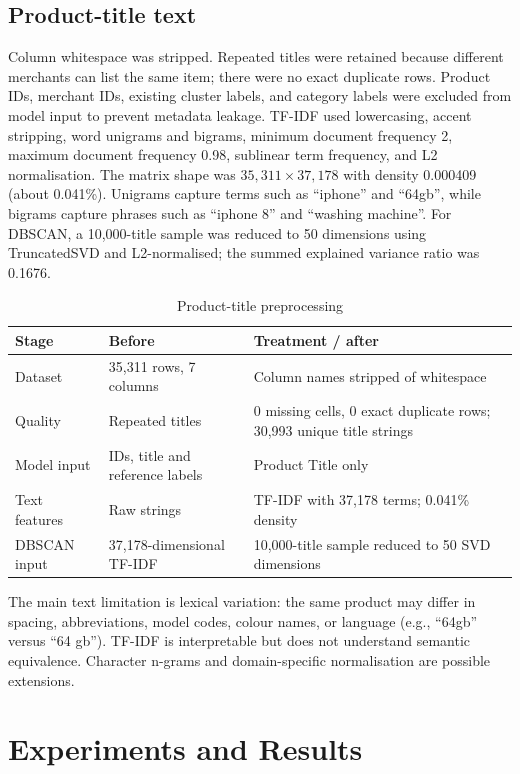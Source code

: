 \documentclass[conference]{IEEEtran}
\begin{document}
\subsection{Product-title text}
Column whitespace was stripped. Repeated titles were retained because different merchants can list the same item; there were no exact duplicate rows. Product IDs, merchant IDs, existing cluster labels, and category labels were excluded from model input to prevent metadata leakage. TF-IDF used lowercasing, accent stripping, word unigrams and bigrams, minimum document frequency 2, maximum document frequency 0.98, sublinear term frequency, and L2 normalisation. The matrix shape was $35{,}311 \times 37{,}178$ with density 0.000409 (about 0.041\%). Unigrams capture terms such as ``iphone'' and ``64gb'', while bigrams capture phrases such as ``iphone 8'' and ``washing machine''. For DBSCAN, a 10,000-title sample was reduced to 50 dimensions using TruncatedSVD and L2-normalised; the summed explained variance ratio was 0.1676.
\begin{table}[t]
\caption{Product-title preprocessing}
\centering\scriptsize
\begin{tabular}{p{}p{}p{}}
\toprule Stage & Before & Treatment / after\\\midrule
Dataset & 35,311 rows, 7 columns & Column names stripped of whitespace\\
Quality & Repeated titles & 0 missing cells, 0 exact duplicate rows; 30,993 unique title strings\\
Model input & IDs, title and reference labels & Product Title only\\
Text features & Raw strings & TF-IDF with 37,178 terms; 0.041\% density\\
DBSCAN input & 37,178-dimensional TF-IDF & 10,000-title sample reduced to 50 SVD dimensions\\
\bottomrule
\end{tabular}
\end{table}
The main text limitation is lexical variation: the same product may differ in spacing, abbreviations, model codes, colour names, or language (e.g., ``64gb'' versus ``64 gb''). TF-IDF is interpretable but does not understand semantic equivalence. Character n-grams and domain-specific normalisation are possible extensions.

\section{Experiments and Results}
\end{document}

